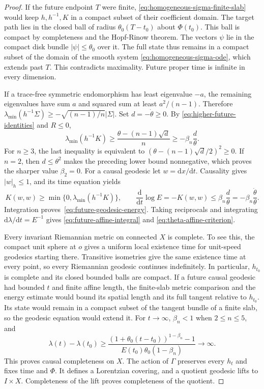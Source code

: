 \documentclass[10pt,a4paper]{article}
\numberwithin{equation}{section}
\theoremstyle{definition}
\theoremstyle{remark}
\newcommand{\dd}{\mathrm d}
\begin{document}
\begin{proof}
If the future endpoint $T$ were finite,
\eqref{eq:homogeneous-sigma-finite-slab} would keep $h,h^{-1},K$
in a compact subset of their coefficient domain.  The target path
lies in the closed ball of radius $\theta_0(T-t_0)$ about
$\Phi(t_0)$.  This ball is compact by completeness and the
Hopf-Rinow theorem.  The vectors $\psi$ lie in the compact disk
bundle $|\psi|\le\theta_0$ over it.  The full state thus remains in
a compact subset of the domain of the smooth system
\eqref{eq:homogeneous-sigma-ode}, which extends past $T$.
This contradicts maximality.  Future proper time is infinite in
every dimension.

If a trace-free symmetric endomorphism has least eigenvalue $-a$,
the remaining eigenvalues have sum $a$ and squared sum at least
$a^2/(n-1)$.  Therefore
$\lambda_{\min}(h^{-1}\Sigma)\ge-\sqrt{(n-1)/n}|\Sigma|$.
Set $d=-\dot\theta\ge0$.  By
\eqref{eq:higher-future-identities} and $R\le0$,
\[
 \lambda_{\min}(h^{-1}K)
 \ge\frac{\theta-(n-1)\sqrt d}{n}
 \ge-\beta_n\frac d\theta.
\]
For $n\ge3$, the last inequality is equivalent to
$(\theta-(n-1)\sqrt d/2)^2\ge0$.  If $n=2$, then
$d\le\theta^2$ makes the preceding lower bound nonnegative, which
proves the sharper value $\beta_2=0$.
For a causal geodesic let $w=\dd x/\dd t$.  Causality gives
$|w|_h\le1$, and its time equation yields
\[
 K(w,w)\ge\min\{0,\lambda_{\min}(h^{-1}K)\},\qquad
 \frac{\dd}{\dd t}\log E=-K(w,w)
 \le \beta_n\frac d\theta=-\beta_n\frac{\dot\theta}{\theta}.
\]
Integration proves~\eqref{eq:future-geodesic-energy}.
Taking reciprocals and integrating
$\dd\lambda/\dd t=E^{-1}$ gives
\eqref{eq:future-affine-integral} and
\eqref{eq:theta-affine-criterion}.

Every invariant Riemannian metric on connected $X$ is complete.
To see this, the compact unit sphere at $o$ gives a uniform local
existence time for unit-speed geodesics starting there.  Transitive
isometries give the same existence time at every point, so every
Riemannian geodesic continues indefinitely.  In particular,
$h_{t_0}$ is complete and its closed bounded balls are compact.
If a future causal geodesic had bounded $t$ and finite affine
length, the finite-slab metric comparison and the energy estimate
would bound its spatial length and its full tangent relative to
$h_{t_0}$.  Its state would remain in a compact subset of the
tangent bundle of a finite slab, so the geodesic equation would
extend it.  For $t\to\infty$, $\beta_n<1$ when $2\le n\le5$, and
\[
 \lambda(t)-\lambda(t_0)
 \ge\frac{(1+\theta_0(t-t_0))^{1-\beta_n}-1}
 {E(t_0)\theta_0(1-\beta_n)}\longrightarrow\infty.
\]
This proves causal completeness on $X$.  The action of $\Gamma$
preserves every $h_t$ and fixes time and $\Phi$.  It defines a
Lorentzian covering, and a quotient geodesic lifts to $I\times X$.
Completeness of the lift proves completeness of the quotient.
\end{proof}
\end{document}
